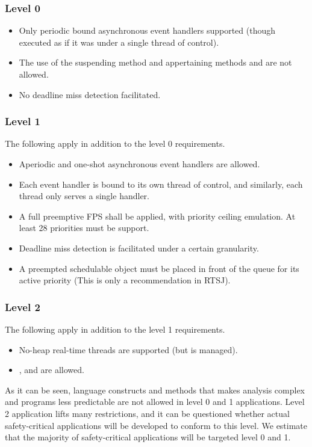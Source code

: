 \subsubsection{Level 0}
\begin{itemize}
	\item Only periodic bound asynchronous event handlers supported (though executed as if it was under a single thread of control).
	\item The use of the suspending method  and appertaining methods  and  are not allowed.
	\item No deadline miss detection facilitated.
\end{itemize}

\subsubsection{Level 1}
The following apply in addition to the level 0 requirements.
\begin{itemize}
	\item Aperiodic and one-shot asynchronous event handlers are allowed.
	\item Each event handler is bound to its own thread of control, and similarly, each thread only serves a single handler.
	\item A full preemptive FPS shall be applied, with priority ceiling emulation. At least 28 priorities must be support.
	\item Deadline miss detection is facilitated under a certain granularity.
	\item A preempted schedulable object must be placed in front of the queue for its active priority (This is only a recommendation in RTSJ).
\end{itemize}

\subsubsection{Level 2}
The following apply in addition to the level 1 requirements.
\begin{itemize}
	\item No-heap real-time threads are supported (but is managed).
	\item {},  and  are allowed.
\end{itemize}

As it can be seen, language constructs and methods that makes analysis complex and programs less predictable are not allowed in level 0 and 1 applications. Level 2 application lifts many restrictions, and it can be questioned whether actual safety-critical applications will be developed to conform to this level. We estimate that the majority of safety-critical applications will be targeted level 0 and 1.

